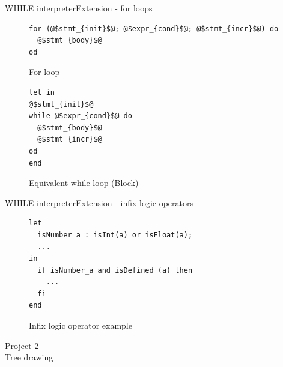 \documentclass{beamer}
\begin{document}
\begin{frame}[fragile]{WHILE interpreter}{Extension - for loops}

\begin{figure}
\begin{lstlisting}
for (@$stmt_{init}$@; @$expr_{cond}$@; @$stmt_{incr}$@) do
  @$stmt_{body}$@
od
\end{lstlisting}
\caption{For loop}
\end{figure}

\begin{figure}
\begin{lstlisting}
let in
@$stmt_{init}$@
while @$expr_{cond}$@ do 
  @$stmt_{body}$@
  @$stmt_{incr}$@
od
end
\end{lstlisting}
\caption{Equivalent while loop (Block)}
\end{figure}
\end{frame}



\begin{frame}[fragile]{WHILE interpreter}{Extension - infix logic operators}
\begin{figure}
\begin{lstlisting}
let
  isNumber_a : isInt(a) or isFloat(a);
  ...
in
  if isNumber_a and isDefined (a) then
    ...
  fi
end
\end{lstlisting}
\caption{Infix logic operator example}
\end{figure}
\end{frame}

\begin{frame}[plain,c]
\begin{center}
\Huge Project 2\\
\vspace{5mm}
\Large Tree drawing
\end{center}
\end{frame}
\end{document}
